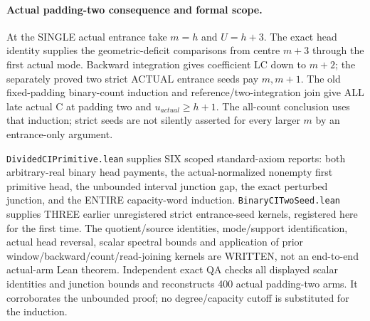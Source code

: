 \paragraph{Actual padding-two consequence and formal scope.}
At the SINGLE actual entrance take $m=h$ and $U=h+3$.
The exact head identity supplies the geometric-deficit comparisons
from centre $m+3$ through the first actual mode. Backward integration
gives coefficient LC down to $m+2$; the separately proved two strict
ACTUAL entrance seeds pay $m,m+1$. The old fixed-padding binary-count
induction and reference/two-integration join give ALL late actual C
at padding two and $u_{actual}\ge h+1$. The all-count conclusion
uses that induction; strict seeds are not silently asserted for
every larger $m$ by an entrance-only argument.

\texttt{DividedCIPrimitive.lean} supplies SIX scoped standard-axiom
reports: both arbitrary-real binary head payments, the actual-normalized
nonempty first primitive head, the unbounded interval junction gap,
the exact perturbed junction, and the ENTIRE capacity-word induction.
\texttt{BinaryCITwoSeed.lean} supplies THREE earlier unregistered
strict entrance-seed kernels, registered here for the first time.
The quotient/source identities, mode/support identification, actual
head reversal, scalar spectral bounds and application of prior
window/backward/count/read-joining kernels are WRITTEN, not an
end-to-end actual-arm Lean theorem. Independent exact QA checks
all displayed scalar identities and junction bounds and reconstructs
400 actual padding-two arms. It corroborates the unbounded proof;
no degree/capacity cutoff is substituted for the induction.

